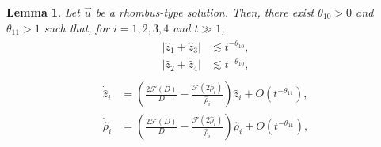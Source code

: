 \documentclass[reqno]{amsart}
\theoremstyle{plain}
\newtheorem{lemma}[theorem]{Lemma}
\theoremstyle{definition}
\numberwithin{equation}{section}
\begin{document}
\begin{lemma}\label{rhombodekai}
Let $\vec{u}$ be a rhombus-type solution. Then, there exist $\theta_{10}>0$ and  $\theta_{11}>1$ such that, for $i=1,2,3,4$ and $t\gg 1$,
\begin{align}\label{hayzyoujunbi}
\begin{aligned}
\left|\hat{z}_1+\hat{z}_3\right|&\lesssim t^{-\theta_{10}},
\\
\left|\hat{z}_2+\hat{z}_4\right|&\lesssim t^{-\theta_{10}},
\end{aligned}
\end{align}
\begin{align}\label{hatzioderhomb}
\begin{aligned}
\dot{\hat{z}}_i&=\left(\frac{2\mathcal{F}(D)}{D}-\frac{\mathcal{F}(2\hat{\rho}_i)}{\hat{\rho}_i}\right)\hat{z}_i+O\left(t^{-\theta_{11}}\right),
\\
\dot{\hat{\rho}}_i&=\left(\frac{2\mathcal{F}(D)}{D}-\frac{\mathcal{F}(2\hat{\rho}_i)}{\hat{\rho}_i}\right)\hat{\rho}_i+O\left(t^{-\theta_{11}}\right),
\end{aligned}
\end{align}
\end{lemma}
\end{document}
